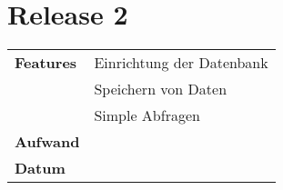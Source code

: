 
\section*{Release 2}
\label{sec:release_2}

\begin{tabular}{p{5cm} p{9cm}}
    \textbf{Features} & Einrichtung der Datenbank \\
    & Speichern von Daten \\
    & Simple Abfragen  \\
    \hline
    \textbf{Aufwand} & \\
    \hline
    \textbf{Datum} & 
\end{tabular}
